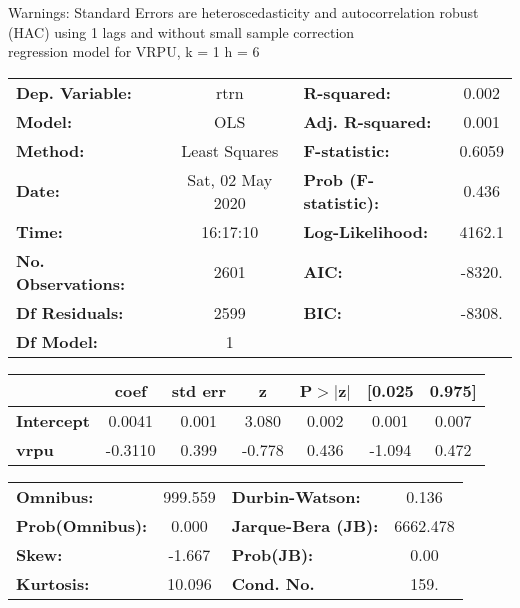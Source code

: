 Warnings: \newline
 [1] Standard Errors are heteroscedasticity and autocorrelation robust (HAC) using 1 lags and without small sample correction\\ 

regression model for VRPU, k = 1 h = 6\begin{center}
\begin{tabular}{lclc}
\toprule
\textbf{Dep. Variable:}    &       rtrn       & \textbf{  R-squared:         } &     0.002   \\
\textbf{Model:}            &       OLS        & \textbf{  Adj. R-squared:    } &     0.001   \\
\textbf{Method:}           &  Least Squares   & \textbf{  F-statistic:       } &    0.6059   \\
\textbf{Date:}             & Sat, 02 May 2020 & \textbf{  Prob (F-statistic):} &    0.436    \\
\textbf{Time:}             &     16:17:10     & \textbf{  Log-Likelihood:    } &    4162.1   \\
\textbf{No. Observations:} &        2601      & \textbf{  AIC:               } &    -8320.   \\
\textbf{Df Residuals:}     &        2599      & \textbf{  BIC:               } &    -8308.   \\
\textbf{Df Model:}         &           1      & \textbf{                     } &             \\
\bottomrule
\end{tabular}
\begin{tabular}{lcccccc}
                   & \textbf{coef} & \textbf{std err} & \textbf{z} & \textbf{P$> |$z$|$} & \textbf{[0.025} & \textbf{0.975]}  \\
\midrule
\textbf{Intercept} &       0.0041  &        0.001     &     3.080  &         0.002        &        0.001    &        0.007     \\
\textbf{vrpu}      &      -0.3110  &        0.399     &    -0.778  &         0.436        &       -1.094    &        0.472     \\
\bottomrule
\end{tabular}
\begin{tabular}{lclc}
\textbf{Omnibus:}       & 999.559 & \textbf{  Durbin-Watson:     } &    0.136  \\
\textbf{Prob(Omnibus):} &   0.000 & \textbf{  Jarque-Bera (JB):  } & 6662.478  \\
\textbf{Skew:}          &  -1.667 & \textbf{  Prob(JB):          } &     0.00  \\
\textbf{Kurtosis:}      &  10.096 & \textbf{  Cond. No.          } &     159.  \\
\bottomrule
\end{tabular}
\end{center}

